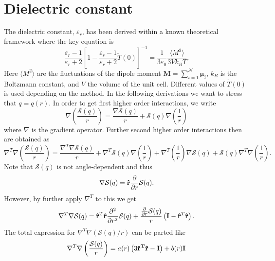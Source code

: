 \documentclass[
journal=jctcce,
manuscript=letter]{achemso}
\begin{document}
\section{Dielectric constant}\label{app:H}
The dielectric constant, $\varepsilon_r$, has been derived within a known theoretical framework\cite{neumann1986computer} where the key equation is
\begin{dmath}
\label{eq:orgDiel}
\frac{\varepsilon_r - 1}{\varepsilon_r + 2}\left[1 - \frac{\varepsilon_r - 1}{\varepsilon_r + 2}\tilde{T}(0) \right]^{-1} = \frac{1}{3\varepsilon_0}\frac{\langle M^2 \rangle}{3Vk_BT}.
\end{dmath}
Here $\langle M^2\rangle$ are the fluctuations of the dipole moment $\boldsymbol{M}=\sum_{i=1}^{\mathcal{N}}\boldsymbol{\mu}_i$, $k_B$ is the Boltzmann constant, and $V$ the volume of the unit cell. Different values of $\tilde{T}(0)$ is used depending on the method. In the following derivations we want to stress that $q=q(r)$. In order to get first higher order interactions, we write
\begin{equation}
\nabla\left(\frac{\mathcal{S}(q)}{r} \right) = \frac{\nabla\mathcal{S}(q)}{r} + \mathcal{S}(q)\nabla\left(\frac{1}{r}\right)
\end{equation}
where $\nabla$ is the gradient operator. Further second higher order interactions then are obtained as
\begin{equation}
\nabla^T\nabla\left(\frac{\mathcal{S}(q)}{r} \right)  =  \frac{\nabla^T\nabla\mathcal{S}(q)}{r} + \nabla^T\mathcal{S}(q)\nabla\left(\frac{1}{r}\right) + \nabla^T\left(\frac{1}{r}\right)\nabla\mathcal{S}(q) + \mathcal{S}(q)\nabla^T\nabla\left(\frac{1}{r}\right).
\end{equation}
Note that $\mathcal{S}(q)$ is not angle-dependent and thus
\begin{equation}
\nabla\mathcal{S}(q) = {\bf \hat{r}}\frac{\partial}{\partial r}\mathcal{S}(q).
\end{equation}
However, by further apply $\nabla^T$ to this we get
\begin{equation}
\nabla^T\nabla\mathcal{S}(q) = {\bf \hat{r}}^T{\bf \hat{r}}\frac{\partial^2}{\partial r^2}\mathcal{S}(q) + \frac{\frac{\partial}{\partial r}\mathcal{S}(q)}{r}\left({\bf I} - {\bf \hat{r}}^T{\bf \hat{r}}   \right).
\end{equation}
The total expression for $\nabla^T\nabla\left(\mathcal{S}(q)/r \right)$ can be parted like
\begin{equation}
\label{eq:T2_exp}
\nabla^T\nabla\left(\frac{\mathcal{S}(q)}{r} \right) = a(r)\left(3\bf{\hat{r}}^T{\bf \hat{r}} - {\bf I}\right) + b(r){\bf I}
\end{equation}
\end{document}
